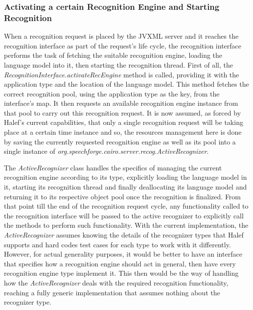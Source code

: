 \subsubsection{Activating a certain Recognition Engine and Starting Recognition}
When a recognition request is placed by the JVXML server and it reaches the recognition interface as part of the request's life cycle, the recognition interface performs the task of fetching the suitable recognition engine, loading the language model into it, then starting the recognition thread.
First of all, the \textit{RecognitionInterface.activateRecEngine} method is called, providing it with the application type and the location of the language model.
This method fetches the correct recognition pool, using the application type as the key, from the interface's map.
It then requests an available recognition engine instance from that pool to carry out this recognition request.
It is now assumed, as forced by Halef's current capabilities, that only a single recognition request will be taking place at a certain time instance and so, the resources management here is done by saving the currently requested recognition engine as well as its pool into a single instance of \textit{org.speechforge.cairo.server.recog.ActiveRecognizer}.

The \textit{ActiveRecognizer} class handles the specifics of managing the current recognition engine according to its type, explicitly loading the language model in it, starting its recognition thread and finally deallocating its language model and returning it to its respective object pool once the recognition is finalized.
From that point till the end of the recognition request cycle, any functionality called to the recognition interface will be passed to the active recognizer to explicitly call the methods to perform such functionality.
With the current implementation, the \textit{ActiveRecognizer} assumes knowing the details of the recognizer types that Halef supports and hard codes test cases for each type to work with it differently.
However, for actual generality purposes, it would be better to have an interface that specifies how a recognition engine should act in general, then have every recognition engine type implement it.
This then would be the way of handling how the \textit{ActiveRecognizer} deals with the required recognition functionality, reaching a fully generic implementation that assumes nothing about the recognizer type.


